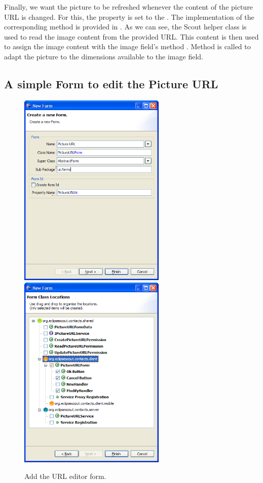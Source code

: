 \documentclass[a4paper,10pt,twoside]{book}
\begin{document}
Finally, we want the picture to be refreshed whenever the content of the picture URL is changed. 
For this, the property  is set to the . 
The implementation of the corresponding method  is provided in . 
As we can see, the Scout helper class  is used to read the image content from the provided URL. 
This content is then used to assign the image content with the image field's method . 
Method  is called to adapt the picture to the dimensions available to the image field. 

\subsection{A simple Form to edit the Picture URL}

\begin{figure}
\includegraphics[width=7cm]{new_form_url_1.png} \hspace{5mm}
\includegraphics[width=7cm]{new_form_url_2.png}
\caption{Add the URL editor form.}
\end{figure}
\end{document}
